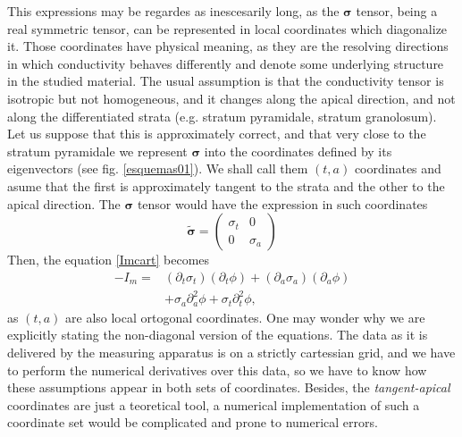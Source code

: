 \documentclass{article}
\newcommand{\cond}{\boldsymbol{\sigma}}
\begin{document}
This expressions may be regardes as inescesarily long, as the 
$\cond$ tensor, being a real symmetric tensor, can be represented
in local coordinates which diagonalize it. Those coordinates have
physical meaning, as they are the resolving directions in which
conductivity behaves differently and denote some underlying structure
in the studied material. The usual assumption is that 
the conductivity tensor is isotropic but not homogeneous, and it 
changes along the apical direction, and not along the 
differentiated strata (e.g. stratum pyramidale, stratum granolosum).
Let us suppose that this is approximately correct, and that very close
to the stratum pyramidale we represent $\cond$ into the coordinates
defined by its eigenvectors (see fig. \ref{esquemas01}).
 We shall call them $(t,a)$ coordinates
and asume that the first is approximately tangent to the
strata and the other to the apical direction. The $\cond$ tensor would 
have the expression in such coordinates
\begin{equation}
\tilde{\cond}=
\begin{pmatrix}
\sigma_t & 0 \\
0 & \sigma_a
\end{pmatrix}
\end{equation} 
Then, the equation \ref{Imcart} becomes
\begin{equation}\label{Imapic}
\begin{split}
-I_m= & (\partial_t \sigma_{t}) (\partial_t \phi) +
(\partial_a \sigma_{a}) (\partial_a \phi)  \\
& + \sigma_{a} \partial_a^2 \phi + \sigma_{t} \partial_t^2 \phi, 
\end{split}
\end{equation}
as $(t,a)$ are also local ortogonal coordinates. 
One may wonder why we are explicitly stating the non-diagonal 
version of the equations. The data as it is delivered by
the measuring apparatus is on a strictly cartessian grid, and
we have to perform the numerical derivatives over this data, so
we have to know how these assumptions appear in both sets
of coordinates. Besides, the \emph{tangent-apical} coordinates
are just a teoretical tool, a numerical implementation of such a coordinate
set would be  complicated and prone to numerical errors. 
\end{document}
